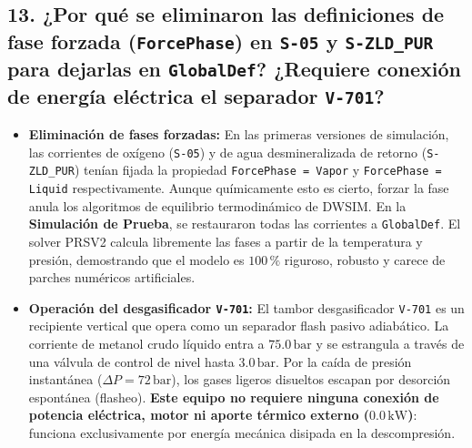 \documentclass[11pt,a4paper]{article}
\begin{document}
\subsection{13. ¿Por qué se eliminaron las definiciones de fase forzada (\texttt{ForcePhase}) en \texttt{S-05} y \texttt{S-ZLD\_PUR} para dejarlas en \texttt{GlobalDef}? ¿Requiere conexión de energía eléctrica el separador \texttt{V-701}?}
\begin{itemize}
    \item \textbf{Eliminación de fases forzadas:} En las primeras versiones de simulación, las corrientes de oxígeno (\texttt{S-05}) y de agua desmineralizada de retorno (\texttt{S-ZLD\_PUR}) tenían fijada la propiedad \texttt{ForcePhase = Vapor} y \texttt{ForcePhase = Liquid} respectivamente. Aunque químicamente esto es cierto, forzar la fase anula los algoritmos de equilibrio termodinámico de DWSIM. En la \textbf{Simulación de Prueba}, se restauraron todas las corrientes a \texttt{GlobalDef}. El solver PRSV2 calcula libremente las fases a partir de la temperatura y presión, demostrando que el modelo es $100\,\%$ riguroso, robusto y carece de parches numéricos artificiales.
    \item \textbf{Operación del desgasificador \texttt{V-701}:} El tambor desgasificador \texttt{V-701} es un recipiente vertical que opera como un separador flash pasivo adiabático. La corriente de metanol crudo líquido entra a $75.0\,\text{bar}$ y se estrangula a través de una válvula de control de nivel hasta $3.0\,\text{bar}$. Por la caída de presión instantánea ($\Delta P = 72\,\text{bar}$), los gases ligeros disueltos escapan por desorción espontánea (flasheo). \textbf{Este equipo no requiere ninguna conexión de potencia eléctrica, motor ni aporte térmico externo ($0.0\,\text{kW}$)}: funciona exclusivamente por energía mecánica disipada en la descompresión.
\end{itemize}
\end{document}
